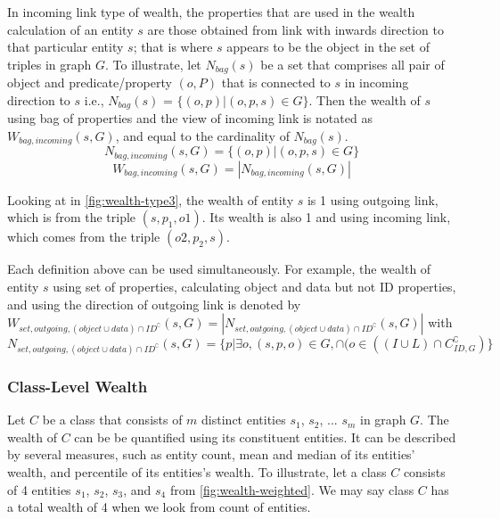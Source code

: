 In incoming link type of wealth, the properties that are used in the wealth calculation of an entity \(s\) are those obtained from link with inwards direction to that particular entity \(s\); that is where \(s\) appears to be the object in the set of triples in graph \(G\). To illustrate, let \(N_{bag}(s)\) be a set that comprises all pair of object and predicate/property \((o,P)\) that is connected to \(s\) in incoming direction to \(s\) i.e., \(N_{bag}(s)\) = \(\{(o, p) | (o, p, s) \in G\}\). Then the wealth of \(s\) using bag of properties and the view of incoming link is notated as \(W_{bag, incoming}(s, G)\), and equal to the cardinality of \(N_{bag}(s)\).
\[
    N_{bag, incoming}(s, G) = \{(o,p) | (o, p, s) \in G\}
\]
\[
    W_{bag, incoming}(s, G) = |N_{bag, incoming}(s, G)|
\]

Looking at in \autoref{fig:wealth-type3}, the wealth of entity \(s\) is 1 using outgoing link, which is from the triple \((s, p_1, o1)\). Its wealth is also 1 and using incoming link, which comes from the triple \((o2, p_2, s)\).

Each definition above can be used simultaneously. For example, the wealth of entity \(s\) using set of properties, calculating object and data but not ID properties, and using the direction of outgoing link is denoted by \(W_{set, outgoing, (object \cup data) \cap ID^\complement}(s, G) = |N_{set, outgoing, (object \cup data) \cap ID^\complement}(s, G)|\) with \(N_{set, outgoing, (object \cup data) \cap ID^\complement}(s, G) = \{p | \exists o, (s, p, o) \in G, \cap (o \in ((I \cup L) \cap C_{ID,G}^\complement)\}\)

\subsubsection{Class-Level Wealth}
Let \(C\) be a class that consists of \(m\) distinct entities \(s_1\), \(s_2\), ... \(s_m\) in graph \(G\). The wealth of \(C\) can be be quantified using its constituent entities. It can be described by several measures, such as entity count, mean and median of its entities' wealth, and percentile of its entities's wealth. To illustrate, let a class \(C\) consists of 4 entities  \(s_1\), \(s_2\), \(s_3\), and \(s_4\) from \autoref{fig:wealth-weighted}. We may say class \(C\) has a total wealth of 4 when we look from count of entities.
